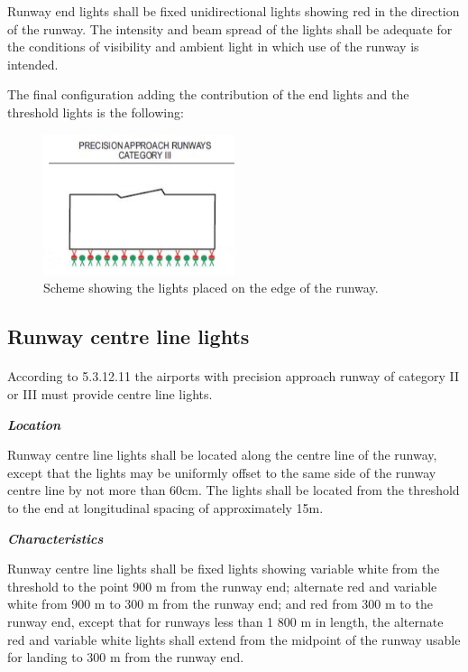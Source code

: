 		Runway end lights shall be fixed unidirectional lights showing red in the direction of the runway. The intensity and beam spread of the lights shall be adequate for the conditions of visibility and ambient light in which use of the runway is intended.
		
		The final configuration adding the contribution of the end lights and the threshold lights is the following:
		
		\begin{figure}[H]
			\centering
			\includegraphics[clip, trim=0cm 0cm 0cm 0cm, width=0.5\textwidth]{./images/Annex14/endlights}
			\caption{Scheme showing the lights placed on the edge of the runway.} %
			\label{} %
		\end{figure}
		
		\subsection{Runway centre line lights}
		\paragraph{}According to 5.3.12.11 the airports with precision approach runway of category II or III must provide centre line lights.
		
		 \textbf{\textit{Location}}
		 
		 Runway centre line lights shall be located along the centre line of the runway, except that the lights may be
		 uniformly offset to the same side of the runway centre line by not more than 60cm. The lights shall be located from the threshold to the end at longitudinal spacing of approximately 15m.
		
		\textbf{\textit{Characteristics}}
		
		Runway centre line lights shall be fixed lights showing variable white from the threshold to the point 900 m
		from the runway end; alternate red and variable white from 900 m to 300 m from the runway end; and red from 300 m to the
		runway end, except that for runways less than 1 800 m in length, the alternate red and variable white lights shall extend from
		the midpoint of the runway usable for landing to 300 m from the runway end.
		
